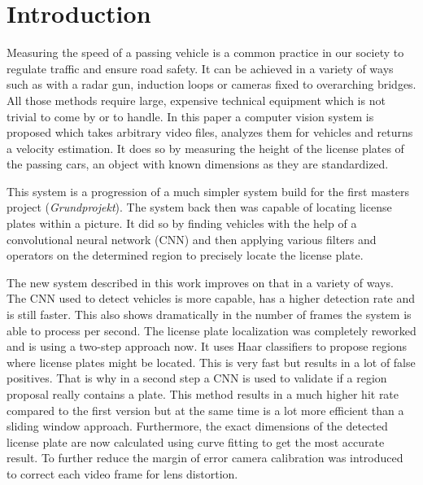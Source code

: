\chapter{Introduction}\label{ch:introduction}

Measuring the speed of a passing vehicle is a common practice in our society to regulate traffic and ensure road safety.
It can be achieved in a variety of ways such as with a radar gun, induction loops or cameras fixed to overarching bridges.
All those methods require large, expensive technical equipment which is not trivial to come by or to handle.
In this paper a computer vision system is proposed which takes arbitrary video files, analyzes them for vehicles and returns a velocity estimation.
It does so by measuring the height of the license plates of the passing cars, an object with known dimensions as they are standardized.

This system is a progression of a much simpler system build for the first masters project (\textit{Grundprojekt}).
The system back then was capable of locating license plates within a picture.
It did so by finding vehicles with the help of a convolutional neural network (CNN) and then applying various filters and operators on the determined region to precisely locate the license plate.

The new system described in this work improves on that in a variety of ways.
The CNN used to detect vehicles is more capable, has a higher detection rate and is still faster.
This also shows dramatically in the number of frames the system is able to process per second.
The license plate localization was completely reworked and is using a two-step approach now.
It uses Haar classifiers to propose regions where license plates might be located.
This is very fast but results in a lot of false positives.
That is why in a second step a CNN is used to validate if a region proposal really contains a plate.
This method results in a much higher hit rate compared to the first version but at the same time is a lot more efficient than a sliding window approach.
Furthermore, the exact dimensions of the detected license plate are now calculated using curve fitting to get the most accurate result.
To further reduce the margin of error camera calibration was introduced to correct each video frame for lens distortion.
